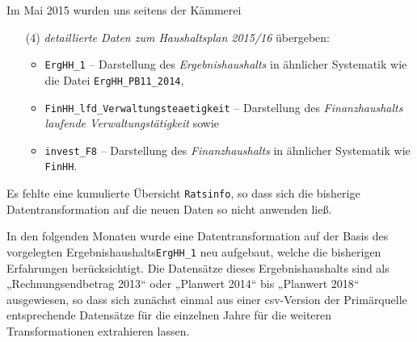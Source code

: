 \documentclass[a4paper,11pt,twoside]{article}
\begin{document}
Im Mai 2015 wurden uns seitens der Kämmerei 
\begin{itemize}
\item [(4)] \emph{detaillierte Daten zum Haushaltsplan 2015/16} übergeben: 
  \begin{itemize}
  \item \texttt{ErgHH\_1} -- Darstellung des \emph{Ergebnishaushalts} in
    ähnlicher Systematik wie die Datei \texttt{ErgHH\_PB11\_2014},
  \item \texttt{FinHH\_lfd\_Verwaltungsteaetigkeit} -- Darstellung des
    \emph{Finanzhaushalts laufende Verwaltungstätigkeit} sowie 
  \item \texttt{invest\_F8} -- Darstellung des \emph{Finanzhaushalts} in
    ähnlicher Systematik wie \texttt{FinHH}.
  \end{itemize}
\end{itemize}
Es fehlte eine kumulierte Übersicht \texttt{Ratsinfo}, so dass sich die
bisherige Datentransformation auf die neuen Daten so nicht anwenden ließ. 

In den folgenden Monaten wurde eine Datentransformation auf der Basis des
vorgelegten Ergebnishaushalts\texttt{ErgHH\_1} neu aufgebaut, welche die
bisherigen Erfahrungen berücksichtigt.  Die Datensätze dieses
Ergebnishaushalts sind als „Rechnungsendbetrag 2013“ oder „Planwert 2014“ bis
„Planwert 2018“ ausgewiesen, so dass sich zunächst einmal aus einer
csv-Version der Primärquelle entsprechende Datensätze für die einzelnen Jahre
für die weiteren Transformationen extrahieren lassen.
\end{document}
